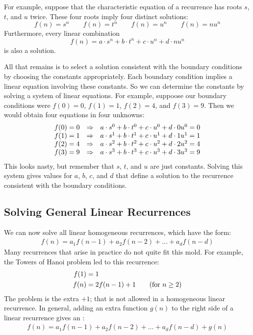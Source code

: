 For example, suppose that the characteristic equation of a
recurrence has roots $s$, $t$, and $u$ twice. These four roots
imply four distinct solutions:
\[
f(n) = s^n \qquad f(n) = t^n \qquad f(n) = u^n \qquad f(n)
  = nu^n
\]
Furthermore, every linear combination
\begin{equation}
f(n) = a \cdot s^n + b \cdot t^n + c \cdot u^n +d \cdot nu^n
\end{equation}
is also a solution.

All that remains is to select a solution consistent with the boundary
conditions by choosing the constants appropriately. Each boundary
condition implies a linear equation involving these constants. So we
can determine the constants by solving a system of linear
equations. For example, suppoose our boundary conditions were $f(0) =
0$, $f(1) = 1$, $f(2) = 4$, and $f(3) = 9$.  Then we would obtain four
equations in four unknowns:
\[
\begin{array}{r@{\quad\Rightarrow\quad}l}
f(0) = 0 & a \cdot s^0 + b \cdot t^0 + c \cdot u^0 +d \cdot
0u^0 = 0 \\
f(1) = 1 & a \cdot s^1 + b \cdot t^1 + c \cdot u^1 +d \cdot
1u^1 = 1 \\
f(2) = 4 & a \cdot s^2 + b \cdot t^2 + c \cdot u^2 +d \cdot
2u^2 = 4 \\
f(3) = 9 & a \cdot s^3 + b \cdot t^3 + c \cdot u^3 +d \cdot
3u^3 = 9
\end{array}
\]
This looks nasty, but remember that $s$, $t$, and $u$ are just
constants. Solving this system gives values for $a$, $b$, $c$, and $d$
that define a solution to the recurrence consistent with the boundary
conditions.

\subsection{Solving General Linear Recurrences}

We can now solve all linear homogeneous recurrences, which have the
form:
\begin{align*}
f(n) = a_1 f(n-1) + a_2 f(n-2) + \ldots + a_d f(n - d)
\end{align*}
Many recurrences that arise in practice do not quite fit this mold.
For example, the Towers of Hanoi problem led to this recurrence:
\begin{align*}
f(1) & = 1 \\
f(n) & = 2 f(n - 1) + 1 \text{\qquad (for $n \geq 2$)}
\end{align*}
The problem is the extra $+1$; that is not allowed in a homogeneous
linear recurrence.  In general, adding an extra function $g(n)$ to the
right side of a linear recurrence gives an :
\begin{align*}
f(n) = a_1 f(n-1) + a_2 f(n-2) + \ldots + a_d f(n - d) + g(n)
\end{align*}

